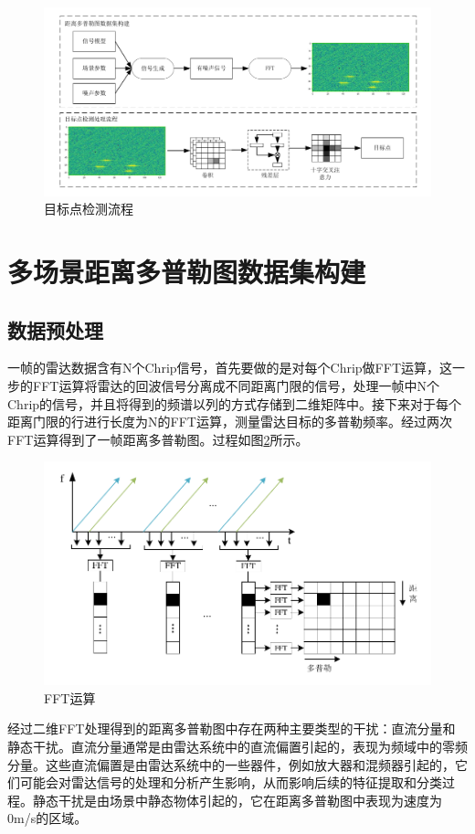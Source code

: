 \begin{figure}[htbp]
	\centering
	\includegraphics[width=\linewidth]{figures/目标点检测流程.pdf}
	\caption{目标点检测流程}
	\label{fig:目标点检测流程}
\end{figure}


\section{多场景距离多普勒图数据集构建}

\subsection{数据预处理}
一帧的雷达数据含有N个Chrip信号，首先要做的是对每个Chrip做FFT运算，这一步的FFT运算将雷达的回波信号分离成不同距离门限的信号，处理一帧中N个Chrip的信号，并且将得到的频谱以列的方式存储到二维矩阵中。接下来对于每个距离门限的行进行长度为N的FFT运算，测量雷达目标的多普勒频率。经过两次FFT运算得到了一帧距离多普勒图。过程如图\ref{fig:FFT运算}所示。
\begin{figure}[htbp]
	\centering
	\includegraphics[width=0.8\linewidth]{figures/FFT运算.pdf}
	\caption{FFT运算}
	\label{fig:FFT运算}
\end{figure}


经过二维FFT处理得到的距离多普勒图中存在两种主要类型的干扰：直流分量和静态干扰。直流分量通常是由雷达系统中的直流偏置引起的\cite{gu2000removal}，表现为频域中的零频分量。这些直流偏置是由雷达系统中的一些器件，例如放大器和混频器引起的，它们可能会对雷达信号的处理和分析产生影响，从而影响后续的特征提取和分类过程。静态干扰是由场景中静态物体引起的，它在距离多普勒图中表现为速度为0m/s的区域。

